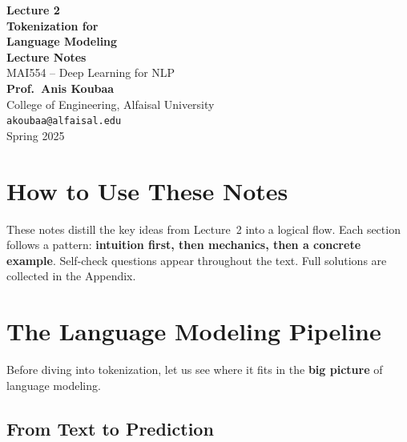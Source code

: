 \documentclass[11pt,a4paper]{article}
\begin{document}
\begin{titlepage}
\centering
\vspace*{3cm}

{\Huge\bfseries\color{alfaisalgreen} Lecture 2}\\[0.8cm]
{\LARGE\bfseries Tokenization for\\[0.3cm] Language Modeling}\\[1.5cm]

{\Large\textbf{Lecture Notes}}\\[0.5cm]
{\large MAI554 -- Deep Learning for NLP}\\[2cm]

{\large\textbf{Prof.\ Anis Koubaa}}\\[0.3cm]
{\normalsize College of Engineering, Alfaisal University}\\[0.2cm]
{\normalsize\texttt{akoubaa@alfaisal.edu}}\\[3cm]

{\normalsize Spring 2025}

\vfill
\end{titlepage}

\section*{How to Use These Notes}

These notes distill the key ideas from Lecture~2 into a logical flow. Each section follows a pattern: \textbf{intuition first, then mechanics, then a concrete example}. Self-check questions appear throughout the text. Full solutions are collected in the Appendix.

\tableofcontents
\newpage

\section{The Language Modeling Pipeline}

Before diving into tokenization, let us see where it fits in the \textbf{big picture} of language modeling.

\subsection{From Text to Prediction}
\end{document}
